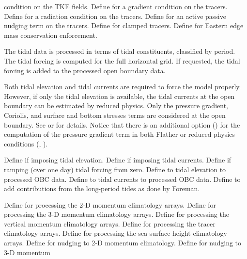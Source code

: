 \begin{klist}
\begin{klist}
   condition on the TKE fields.
       Define for a gradient
   condition on the tracers.
       Define for a radiation
   condition on the tracers.
       Define for an active passive nudging term
   on the tracers.
       Define for clamped tracers.
       Define for Eastern edge mass conservation
   enforcement.
  \end{klist}
   \mbox{}
The tidal data is processed in terms of tidal constituents, classified by
period. The tidal forcing is computed for the full horizontal grid.
If requested, the tidal forcing is added to the processed open
boundary data.

Both tidal elevation and tidal currents are required to force the model
properly. However, if only the tidal elevation is available, the tidal
currents at the open boundary can be estimated by reduced physics.
Only the pressure gradient, Coriolis, and surface and bottom stresses
terms are considered at the open boundary. See  or
 for details. Notice that there is an additional option
() for the computation of the pressure gradient
term in both Flather or reduced physics conditions (,
).
  \begin{klist}
      Define if imposing tidal elevation.
      Define if imposing tidal currents.
      Define if ramping (over one day) tidal forcing
     from zero.
      Define to tidal elevation to processed OBC data.
      Define to tidal currents to processed OBC data.
      Define to add contributions from the
     long-period tides as done by Foreman.
  \end{klist}
   \mbox{}
  \begin{klist}
      Define for processing the 2-D momentum
   climatology arrays.
      Define for processing the 3-D momentum
   climatology arrays.
      Define for processing the vertical momentum
   climatology arrays.
      Define for processing the tracer climatology arrays.
      Define for processing the sea surface height
   climatology arrays.
          Define for nudging to 2-D momentum
   climatology.
          Define for nudging to 3-D momentum

\end{klist}
\end{klist}

